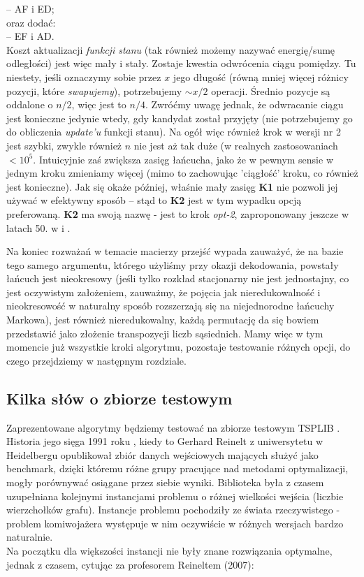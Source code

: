 \documentclass[a4paper]{article}
\theoremstyle{defn}
\theoremstyle{theorem}
\theoremstyle{lemma}
\theoremstyle{cor}
\theoremstyle{fact}
\begin{document}
\begin{enumerate}
– AF i ED;\\
oraz dodać:\\
– EF i AD.\\
Koszt aktualizacji \textit{funkcji stanu} (tak również możemy nazywać energię/sumę odległości) jest więc mały i stały. Zostaje kwestia odwrócenia ciągu pomiędzy. Tu niestety, jeśli oznaczymy sobie przez $x$ jego długość (równą mniej więcej różnicy pozycji, które \textit{swapujemy}), potrzebujemy $\sim x/2$ operacji. Średnio pozycje są oddalone o $n/2$, więc jest to $n/4$. Zwróćmy uwagę jednak, że odwracanie ciągu jest konieczne jedynie wtedy, gdy kandydat został przyjęty (nie potrzebujemy go do obliczenia \textit{update'u} funkcji stanu). Na ogół więc również krok w wersji nr 2 jest szybki, zwykle również $n$ nie jest aż tak duże (w realnych zastosowaniach $<10^5$. Intuicyjnie zaś zwiększa zasięg łańcucha, jako że w pewnym sensie w jednym kroku zmieniamy więcej (mimo to zachowując 'ciągłość' kroku, co również jest konieczne). Jak się okaże później, właśnie mały zasięg \textbf{K1}  nie pozwoli jej używać w efektywny sposób – stąd to \textbf{K2} jest w tym wypadku opcją preferowaną.
\textbf{K2} ma swoją nazwę - jest to krok \textit{opt-2}, zaproponowany jeszcze w latach 50. w \cite{2opt1} i \cite{2opt2}.
\end{enumerate}
Na koniec rozważań w temacie macierzy przejść wypada zauważyć, że na bazie tego samego argumentu, którego użyliśmy przy okazji dekodowania, powstały łańcuch jest nieokresowy (jeśli tylko rozkład stacjonarny nie jest jednostajny, co jest oczywistym założeniem, zauważmy, że pojęcia jak nieredukowalność i nieokresowość w naturalny sposób rozszerzają się na niejednorodne łańcuchy Markowa), jest również nieredukowalny, każdą permutację da się bowiem przedstawić jako złożenie transpozycji liczb sąsiednich.
Mamy więc w tym momencie już wszystkie kroki algorytmu, pozostaje testowanie różnych opcji, do czego przejdziemy w następnym rozdziale.

\subsection{Kilka słów o zbiorze testowym}
Zaprezentowane algorytmy będziemy testować na zbiorze testowym TSPLIB \cite{benchmark}. Historia jego sięga 1991 roku \cite{reinh}, kiedy to Gerhard Reinelt z uniwersytetu w Heidelbergu opublikował zbiór danych wejściowych mających służyć jako benchmark, dzięki któremu różne grupy pracujące nad metodami optymalizacji, mogły porównywać osiągane przez siebie wyniki. Biblioteka była z czasem uzupełniana kolejnymi instancjami problemu o różnej wielkości wejścia (liczbie wierzchołków grafu). Instancje problemu pochodziły ze świata rzeczywistego - problem komiwojażera występuje w nim oczywiście w różnych wersjach bardzo naturalnie. \\
Na początku dla większości instancji nie były znane rozwiązania optymalne, jednak z czasem, cytując za profesorem Reineltem (2007):
\end{document}
